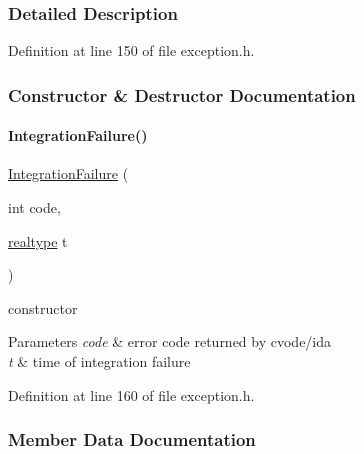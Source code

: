 \subsubsection{Detailed Description}


Definition at line 150 of file exception.\+h.



\subsubsection{Constructor \& Destructor Documentation}
\mbox{\label{classamici_1_1_integration_failure_a3e72353970444d949c15761bdcbc5e7f}} 
\paragraph{\texorpdfstring{IntegrationFailure()}{IntegrationFailure()}}
{\footnotesize\ttfamily \mbox{\hyperlink{classamici_1_1_integration_failure}{Integration\+Failure}} (\begin{DoxyParamCaption}\item[{int}]{code,  }\item[{\mbox{\hyperlink{namespaceamici_a1bdce28051d6a53868f7ccbf5f2c14a3}{realtype}}}]{t }\end{DoxyParamCaption})}

constructor 
\begin{DoxyParams}{Parameters}
{\em code} & error code returned by cvode/ida \\
\hline
{\em t} & time of integration failure \\
\hline
\end{DoxyParams}


Definition at line 160 of file exception.\+h.



\subsubsection{Member Data Documentation}
\mbox{\label{classamici_1_1_integration_failure_a7d16b1c68c87cec009d972e79abfba78}} 
